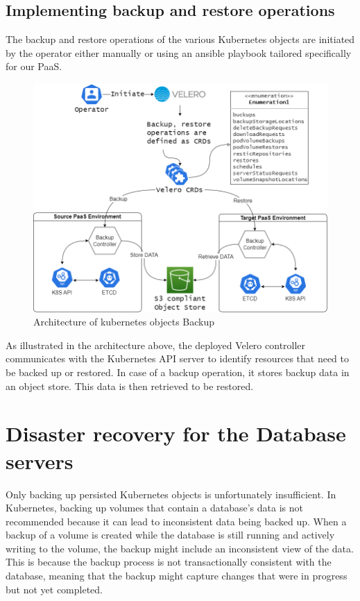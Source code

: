 \subsection{Implementing backup and restore operations }

The backup and restore operations of the various Kubernetes objects are initiated by the operator either manually or using an ansible playbook tailored specifically for our PaaS. 

 \begin{figure}[H]\centering
\includegraphics[width=1.0\textwidth,angle=00]{assets/f57.png}
\caption{Architecture of kubernetes objects Backup }
\label{fig:f57}
\end{figure}

As illustrated in the architecture above, the deployed Velero controller communicates with the Kubernetes API server to identify resources that need to be backed up or restored. In case of a backup operation, it stores backup data in an object store. This data is then retrieved to be restored. 

 

\section{Disaster recovery for the Database servers }

Only backing up persisted Kubernetes objects is unfortunately insufficient. In Kubernetes, backing up volumes that contain a database's data is not recommended because it can lead to inconsistent data being backed up. When a backup of a volume is created while the database is still running and actively writing to the volume, the backup might include an inconsistent view of the data. This is because the backup process is not transactionally consistent with the database, meaning that the backup might capture changes that were in progress but not yet completed. 

